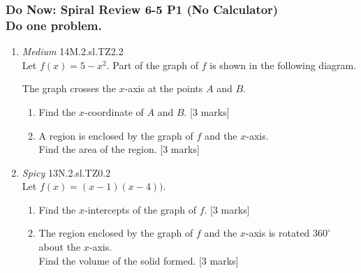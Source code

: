 \documentclass[12pt, twoside]{article}
\begin{document}
\subsubsection*{Do Now: Spiral Review 6-5 P1 (No Calculator)\\Do one problem.}
 \begin{enumerate}

  \item \emph{Medium} 14M.2.sl.TZ2.2\\
  Let $f(x)=5-x^2$. Part of the graph of $f$ is shown in the following diagram.
    \begin{center}
    \end{center}
    The graph crosses the $x$-axis at the points $A$ and $B$.
    \begin{enumerate}
      \item Find the $x$-coordinate of $A$ and $B$. [3 marks]
      \item A region is enclosed by the graph of $f$ and the $x$-axis.\\
      Find the area of the region. [3 marks]
    \end{enumerate}
\vspace{1cm}

   \item \emph{Spicy} 13N.2.sl.TZ0.2\\
   Let $f(x)=(x-1)(x-4))$.
   \begin{enumerate}
     \item Find the $x$-intercepts of the graph of $f$. [3 marks]
     \item The region enclosed by the graph of $f$ and the $x$-axis is rotated $360^\circ$ about the $x$-axis.\\
     Find the volume of the solid formed. [3 marks]
   \end{enumerate}


\end{enumerate}
\end{document}

